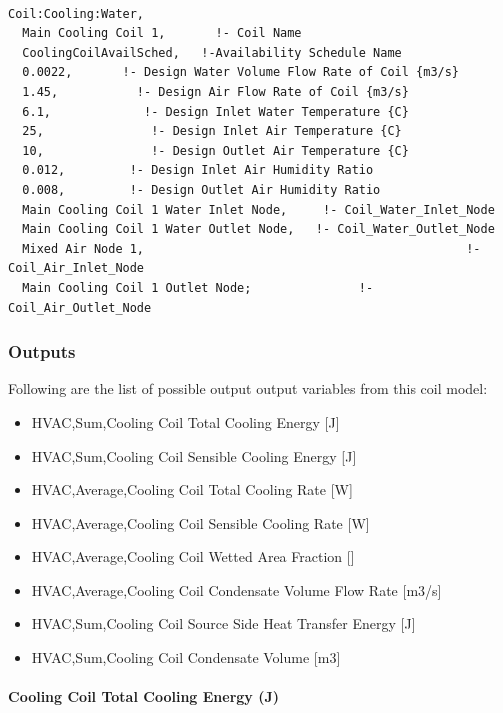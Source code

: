 \begin{lstlisting}

Coil:Cooling:Water,
  Main Cooling Coil 1,       !- Coil Name
  CoolingCoilAvailSched,   !-Availability Schedule Name
  0.0022,       !- Design Water Volume Flow Rate of Coil {m3/s}
  1.45,           !- Design Air Flow Rate of Coil {m3/s}
  6.1,             !- Design Inlet Water Temperature {C}
  25,               !- Design Inlet Air Temperature {C}
  10,               !- Design Outlet Air Temperature {C}
  0.012,         !- Design Inlet Air Humidity Ratio
  0.008,         !- Design Outlet Air Humidity Ratio
  Main Cooling Coil 1 Water Inlet Node,     !- Coil_Water_Inlet_Node
  Main Cooling Coil 1 Water Outlet Node,   !- Coil_Water_Outlet_Node
  Mixed Air Node 1,                                             !- Coil_Air_Inlet_Node
  Main Cooling Coil 1 Outlet Node;               !- Coil_Air_Outlet_Node
\end{lstlisting}

\subsubsection{Outputs}\label{outputs-015}

Following are the list of possible output output variables from this coil model:

\begin{itemize}
\item
  HVAC,Sum,Cooling Coil Total Cooling Energy {[}J{]}
\item
  HVAC,Sum,Cooling Coil Sensible Cooling Energy {[}J{]}
\item
  HVAC,Average,Cooling Coil Total Cooling Rate {[}W{]}
\item
  HVAC,Average,Cooling Coil Sensible Cooling Rate {[}W{]}
\item
  HVAC,Average,Cooling Coil Wetted Area Fraction {[]}
\item
  HVAC,Average,Cooling Coil Condensate Volume Flow Rate {[}m3/s{]}
\item
  HVAC,Sum,Cooling Coil Source Side Heat Transfer Energy {[}J{]}
\item
  HVAC,Sum,Cooling Coil Condensate Volume {[}m3{]}
\end{itemize}

\paragraph{Cooling Coil Total Cooling Energy (J)}\label{cooling-coil-total-cooling-energy-j}

